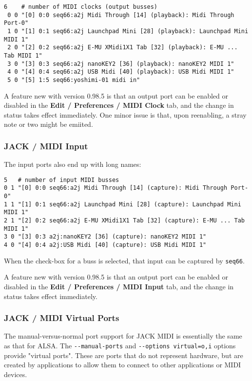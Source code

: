   \begin{verbatim}
6    # number of MIDI clocks (output busses)
 0 0 "[0] 0:0 seq66:a2j Midi Through [14] (playback): Midi Through Port-0"
 1 0 "[1] 0:1 seq66:a2j Launchpad Mini [28] (playback): Launchpad Mini MIDI 1"
 2 0 "[2] 0:2 seq66:a2j E-MU XMidi1X1 Tab [32] (playback): E-MU ... Tab MIDI 1"
 3 0 "[3] 0:3 seq66:a2j nanoKEY2 [36] (playback): nanoKEY2 MIDI 1"
 4 0 "[4] 0:4 seq66:a2j USB Midi [40] (playback): USB Midi MIDI 1"
 5 0 "[5] 1:5 seq66:yoshimi-01 midi in"
   \end{verbatim}

   A feature new with version 0.98.5 is that an output port can be enabled or
   disabled in the 
	\textbf{Edit / Preferences / MIDI Clock} tab,
   and the change in status takes effect immediately.
   One minor issue is that, upon reenabling, a stray note or two might be
   emiited.

\subsubsection{JACK / MIDI Input}
\label{subsubsec:jack_midi_input}

   The input ports also end up with long names:

   \begin{verbatim}
5   # number of input MIDI busses
0 1 "[0] 0:0 seq66:a2j Midi Through [14] (capture): Midi Through Port-0"
1 1 "[1] 0:1 seq66:a2j Launchpad Mini [28] (capture): Launchpad Mini MIDI 1"
2 1 "[2] 0:2 seq66:a2j E-MU XMidi1X1 Tab [32] (capture): E-MU ... Tab MIDI 1"
3 0 "[3] 0:3 a2j:nanoKEY2 [36] (capture): nanoKEY2 MIDI 1"
4 0 "[4] 0:4 a2j:USB Midi [40] (capture): USB Midi MIDI 1"
   \end{verbatim}

   When the check-box for a buss is selected, that input can be captured by
   \texttt{seq66}.

   A feature new with version 0.98.5 is that an output port can be enabled or
   disabled in the 
	\textbf{Edit / Preferences / MIDI Input} tab,
   and the change in status takes effect immediately.

\subsubsection{JACK / MIDI Virtual Ports}
\label{subsubsec:jack_midi_virtual_ports}

   The manual-versus-normal port support for JACK MIDI is essentially the same
   as that for ALSA.
   The \texttt{-{}-manual-ports} and
   \texttt{-{}-options virtual=o,i} options provide
   "virtual ports".  These are ports that do not represent
   hardware, but are created by applications to allow them to connect to other
   applications or MIDI devices.

